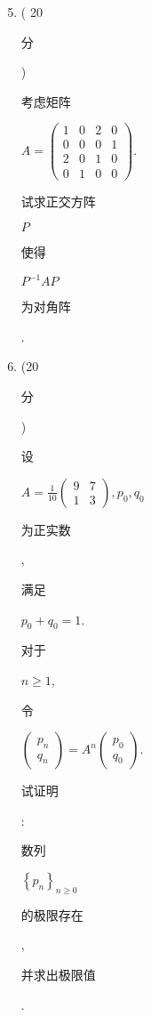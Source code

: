 \documentclass[10pt]{article}
\begin{document}
\begin{enumerate}
  \setcounter{enumi}{4}
  \item ( 20 \begin{CJK}{UTF8}{mj}分\end{CJK}) \begin{CJK}{UTF8}{mj}考虑矩阵\end{CJK} $A=\left(\begin{array}{cccc}1 & 0 & 2 & 0 \\ 0 & 0 & 0 & 1 \\ 2 & 0 & 1 & 0 \\ 0 & 1 & 0 & 0\end{array}\right)$. \begin{CJK}{UTF8}{mj}试求正交方阵\end{CJK} $P$ \begin{CJK}{UTF8}{mj}使得\end{CJK} $P^{-1} A P$ \begin{CJK}{UTF8}{mj}为对角阵\end{CJK}.

  \item (20 \begin{CJK}{UTF8}{mj}分\end{CJK}) \begin{CJK}{UTF8}{mj}设\end{CJK} $A=\frac{1}{10}\left(\begin{array}{cc}9 & 7 \\ 1 & 3\end{array}\right), p_{0}, q_{0}$ \begin{CJK}{UTF8}{mj}为正实数\end{CJK}, \begin{CJK}{UTF8}{mj}满足\end{CJK} $p_{0}+q_{0}=1$. \begin{CJK}{UTF8}{mj}对于\end{CJK} $n \geqslant 1$, \begin{CJK}{UTF8}{mj}令\end{CJK} $\left(\begin{array}{c}p_{n} \\ q_{n}\end{array}\right)=A^{n}\left(\begin{array}{c}p_{0} \\ q_{0}\end{array}\right)$. \begin{CJK}{UTF8}{mj}试证明\end{CJK}: \begin{CJK}{UTF8}{mj}数列\end{CJK} $\left\{p_{n}\right\}_{n \geqslant 0}$ \begin{CJK}{UTF8}{mj}的极限存在\end{CJK}, \begin{CJK}{UTF8}{mj}并求出极限值\end{CJK}.

\end{enumerate}
\end{document}
